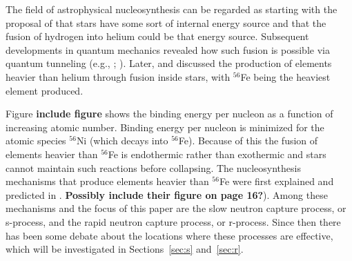 The field of astrophysical nucleosynthesis can be regarded as starting with the proposal of \cite{eddington1920} that stars have some sort of internal energy source and that the fusion of hydrogen into helium could be that energy source.  Subsequent developments in quantum mechanics revealed how such fusion is possible via quantum tunneling (e.g., \citealt{gurneycondon1928}; \citealt{atkinson1929}). Later, \cite{hoyle1946} and \cite{hoyle1954} discussed the production of elements heavier than helium through fusion inside stars, with $^{56}$Fe being the heaviest element produced.

Figure {\bf include figure} shows the binding energy per nucleon as a function of increasing atomic number.  Binding energy per nucleon is minimized for the atomic species $^{56}$Ni (which decays into $^{56}$Fe).  Because of this the fusion of elements heavier than $^{56}$Fe is endothermic rather than exothermic and stars cannot maintain such reactions before collapsing.  The nucleosynthesis mechanisms that produce elements heavier than $^{56}$Fe were first explained and predicted in \cite{burbidge1957}.  {\bf Possibly include their figure on page 16?}).  Among these mechanisms and the focus of this paper are the slow neutron capture process, or s-process, and the rapid neutron capture process, or r-process.  
Since then there has been some debate about the locations where these processes are effective, which will be investigated in Sections~\ref{sec:s} and~\ref{sec:r}.